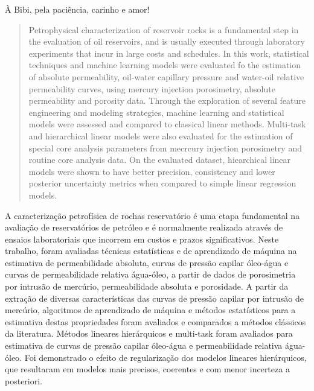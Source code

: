 \documentclass[english,msc,numbers]{coppe}
\begin{document}
  À Bibi, pela paciência, carinho e amor!
 \begin{abstract}
Petrophysical characterization of reservoir rocks is a fundamental step in the evaluation of oil reservoirs, and is usually executed through laboratory experiments that incur in large costs and schedules. In this work, statistical techniques and machine learning models were evaluated fo the estimation of absolute permeability, oil-water capillary pressure and water-oil relative permeability curves, using mercury injection porosimetry, absolute permeability and porosity data. Through the exploration of several feature engineering and modeling strategies, machine learning and statistical models were assessed and compared to classical linear methods. Multi-task and hierarchical linear models were also evaluated for the estimation of special core analysis parameters from mecrcury injection porosimetry and routine core analysis data. On the evaluated dataset, hiearchical linear models were shown to have better precision, consistency and lower posterior uncertainty metrics when compared to simple linear regression models.
 \end{abstract}
  \begin{foreignabstract}
A caracterização petrofísica de rochas reservatório é uma etapa fundamental na avaliação de reservatórios de petróleo e é normalmente realizada através de ensaios laboratoriais que incorrem em custos e prazos significativos. Neste trabalho, foram avaliadas técnicas estatísticas e de aprendizado de máquina na estimativa de permeabilidade absoluta, curvas de pressão capilar óleo-água e curvas de permeabilidade relativa água-óleo, a partir de dados de porosimetria por intrusão de mercúrio, permeabilidade absoluta e porosidade. A partir da extração de diversas características das curvas de pressão capilar por intrusão de mercúrio, algoritmos de aprendizado de máquina e métodos estatísticos para a estimativa destas propriedades foram avaliados e comparados a métodos clássicos da literatura. Métodos lineares hierárquicos e multi-task foram avaliados para estimativa de curvas de pressão capilar óleo-água e permeabilidade relativa água-óleo. Foi demonstrado o efeito de regularização dos modelos lineares hierárquicos, que resultaram em modelos mais precisos, coerentes e com menor incerteza a posteriori.
  \end{foreignabstract}
  \tableofcontents
  \listoffigures

  \listoftables
  \printlosymbols
  \printloabbreviations
\end{document}
